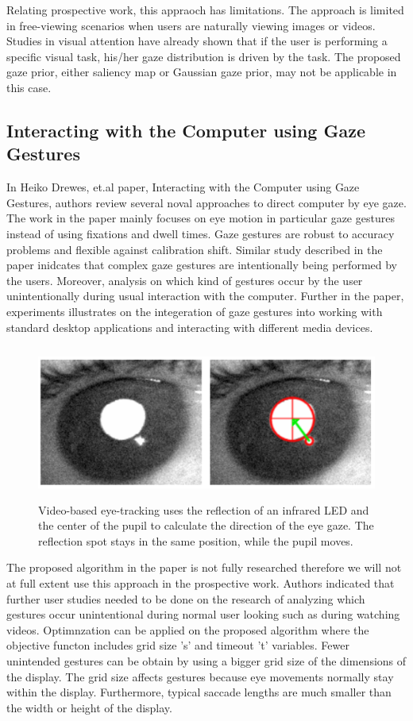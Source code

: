 Relating prospective work, this appraoch has limitations. The approach is limited in free-viewing scenarios when users are naturally viewing images or videos. Studies in visual attention have already shown that if the user is performing a specific visual task, his/her gaze distribution is driven by the task. The proposed gaze prior, either saliency map or Gaussian gaze prior, may not be applicable in this case.

\subsection{Interacting with the Computer using Gaze Gestures}

In Heiko Drewes, et.al \cite{22} paper, Interacting with the Computer using Gaze Gestures, authors review several noval approaches to direct computer by eye gaze. The work in the paper mainly focuses on eye motion in particular gaze gestures instead of using fixations and dwell times. Gaze gestures are robust to accuracy problems and flexible against calibration shift. Similar study described in the paper inidcates that complex gaze gestures are intentionally being performed by the users. Moreover, analysis on which kind of gestures occur by the user unintentionally during usual interaction with the computer. Further in the paper, experiments illustrates on the integeration of gaze gestures into working with standard desktop applications and interacting with different media devices.

\begin{figure}[!hbt]
  \centering
  \includegraphics[width=4.5in,height=2in]{heiko.png}
  \caption{Video-based eye-tracking uses the reflection of an infrared LED and the center of the pupil to calculate the direction of the eye gaze. The reflection spot stays in the same position, while the pupil moves.}
  \label{heiko}
\end{figure}

The proposed algorithm in the paper is not fully researched therefore we will not at full extent use this approach in the prospective work. Authors indicated that further user studies needed to be done on the research of analyzing which gestures occur unintentional during normal user looking such as during watching videos. Optimnzation can be applied on the proposed algorithm where the objective functon includes grid size 's' and timeout 't' variables. Fewer unintended gestures can be obtain by using a bigger grid size of the dimensions of the display. The grid size affects gestures because eye movements normally stay within the display. Furthermore, typical saccade lengths are much smaller than the width or height of the display.



